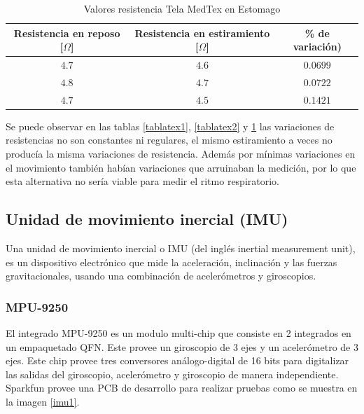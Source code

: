 \begin{table}[H]
\centering
\begin{tabular}{| c | c | c |}
\hline
\multicolumn{1}{|c|}{\textbf{Resistencia en reposo [$\Omega$]}}&
\multicolumn{1}{c|}{\textbf{Resistencia en estiramiento [$\Omega$]}}&
\multicolumn{1}{|c|}{\textbf{\% de variación)}}\\ \hline
$4.7$  & $4.6$  & $0.0699$  \\ \hline
$4.8$  & $4.7$ & $0.0722$ \\ \hline
$4.7$ & $4.5$  & $0.1421$  \\ \hline
\end{tabular}
\caption{Valores resistencia Tela MedTex en Estomago}
\label{tablatex3}
\end{table}

Se puede observar en las tablas \ref{tablatex1}, \ref{tablatex2} y \ref{tablatex3} las variaciones de resistencias no son constantes ni regulares, el mismo estiramiento a veces no producía la misma variaciones de resistencia. Además por mínimas variaciones en el movimiento también habían variaciones que arruinaban la medición, por lo que esta alternativa no sería viable para medir el ritmo respiratorio.

\subsection{Unidad de movimiento inercial (IMU)}
Una unidad de movimiento inercial o IMU (del inglés inertial measurement unit), es un dispositivo electrónico que mide la aceleración, inclinación y las fuerzas gravitacionales, usando una combinación de acelerómetros y giroscopios.
\subsubsection{MPU-9250}
El integrado MPU-9250 es un modulo multi-chip que consiste en 2 integrados en un empaquetado QFN. Este provee un giroscopio de 3 ejes y un acelerómetro de 3 ejes.
Este chip provee tres conversores análogo-digital de 16 bits para digitalizar las salidas del giroscopio, acelerómetro y giroscopio de manera independiente.\\
Sparkfun provee una PCB de desarrollo para realizar pruebas como se muestra en la imagen \ref{imu1}.

